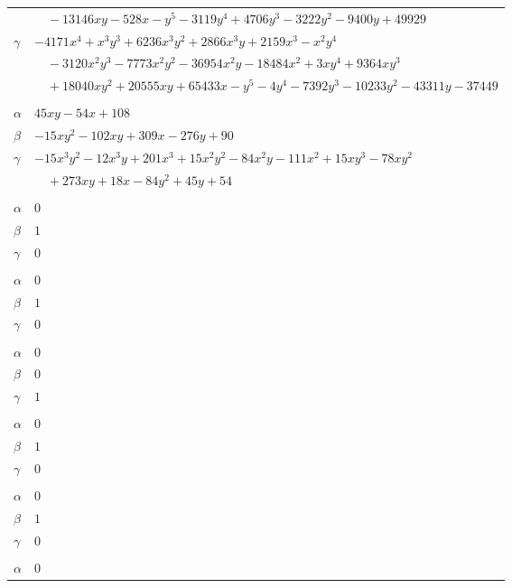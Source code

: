 \documentclass[11pt]{article}
\begin{document}
\begin{longtable}{@{}ll@{}}
 & $\quad -13146xy-528x-y^{5}-3119y^{4}+4706y^{3}-3222y^{2}-9400y+49929$\\
$\gamma$ & $-4171x^{4}+x^{3}y^{3}+6236x^{3}y^{2}+2866x^{3}y+2159x^{3}-x^{2}y^{4}$\\
 & $\quad -3120x^{2}y^{3}-7773x^{2}y^{2}-36954x^{2}y-18484x^{2}+3xy^{4}+9364xy^{3}$\\
 & $\quad +18040xy^{2}+20555xy+65433x-y^{5}-4y^{4}-7392y^{3}-10233y^{2}-43311y-37449$\\
\addlinespace[3pt]
\multicolumn{2}{@{}l}{$\{i,j\}=\{123,221\}$, $k_{ij}=2^{2}\cdot 3^{4}$}\\
$\alpha$ & $45xy-54x+108$\\
$\beta$ & $-15xy^{2}-102xy+309x-276y+90$\\
$\gamma$ & $-15x^{3}y^{2}-12x^{3}y+201x^{3}+15x^{2}y^{2}-84x^{2}y-111x^{2}+15xy^{3}-78xy^{2}$\\
 & $\quad +273xy+18x-84y^{2}+45y+54$\\
\addlinespace[3pt]
\multicolumn{2}{@{}l}{$\{i,j\}=\{176,191\}$, $k_{ij}=2$}\\
$\alpha$ & $0$\\
$\beta$ & $1$\\
$\gamma$ & $0$\\
\addlinespace[3pt]
\multicolumn{2}{@{}l}{$\{i,j\}=\{176,198\}$, $k_{ij}=2$}\\
$\alpha$ & $0$\\
$\beta$ & $1$\\
$\gamma$ & $0$\\
\addlinespace[3pt]
\multicolumn{2}{@{}l}{$\{i,j\}=\{186,187\}$, $k_{ij}=3\cdot 7$}\\
$\alpha$ & $0$\\
$\beta$ & $0$\\
$\gamma$ & $1$\\
\addlinespace[3pt]
\multicolumn{2}{@{}l}{$\{i,j\}=\{187,188\}$, $k_{ij}=3\cdot 7$}\\
$\alpha$ & $0$\\
$\beta$ & $1$\\
$\gamma$ & $0$\\
\addlinespace[3pt]
\multicolumn{2}{@{}l}{$\{i,j\}=\{187,189\}$, $k_{ij}=3\cdot 7$}\\
$\alpha$ & $0$\\
$\beta$ & $1$\\
$\gamma$ & $0$\\
\addlinespace[3pt]
\multicolumn{2}{@{}l}{$\{i,j\}=\{187,196\}$, $k_{ij}=3\cdot 7$}\\
$\alpha$ & $0$\\

\end{longtable}
\end{document}

